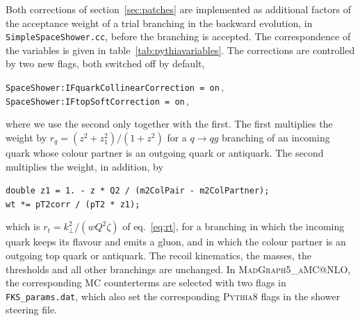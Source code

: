 \documentclass[a4paper,11pt]{article}
\makeatletter
\newcommand{\kt}{k_\perp}
\newcommand{\mgamc}{\textsc{MadGraph5\_aMC@NLO}\xspace}
\newcommand{\pythia}{\textsc{Pythia8}\xspace}
\newcommand{\code}[1]{\texttt{#1}}
\makeatother
\begin{document}
Both corrections of section~\ref{sec:patches} are implemented as
additional factors of the acceptance weight of a trial branching in
the backward evolution, in \code{SimpleSpaceShower.cc}, before the
branching is accepted. The correspondence of the variables is given in
table~\ref{tab:pythiavariables}. The corrections are controlled by two
new flags, both switched off by default,
\begin{center}
  \code{SpaceShower:IFquarkCollinearCorrection = on}\,,\qquad
  \code{SpaceShower:IFtopSoftCorrection = on}\,,
\end{center}
where we use the second only together with the first. The first
multiplies the weight
by $r_q=(z^2+z_1^2)/(1+z^2)$ for a $q\to qg$ branching of an incoming
quark whose colour partner is an outgoing quark or antiquark. The
second multiplies the weight, in addition, by
\begin{center}
  \code{double z1 = 1. - z * Q2 / (m2ColPair - m2ColPartner);}\\
  \code{wt *= pT2corr / (pT2 * z1);}
\end{center}
which is $r_t=\kt^2/(wQ^2\zeta)$ of eq.~\eqref{eq:rt}, for a branching
in which the incoming quark keeps its flavour and emits a gluon, and in
which the colour partner is an outgoing top quark or antiquark. The
recoil kinematics, the masses, the thresholds and all other
branchings are unchanged. In \mgamc, the corresponding MC counterterms
are selected with two flags in \code{FKS\_params.dat}, which also set
the corresponding \pythia flags in the shower steering file.



\end{document}
